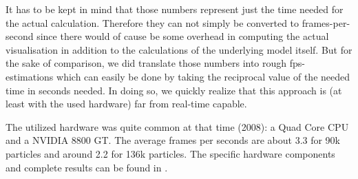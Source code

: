 It has to be kept in mind that those numbers represent just the time needed for the actual calculation. Therefore they can not simply be converted to frames-per-second since there would of cause be some overhead in computing the actual visualisation in addition to the calculations of the underlying model itself. But for the sake of comparison, we did translate those numbers into rough fps-estimations which can easily be done by taking the reciprocal value of the needed time in seconds needed. In doing so, we quickly realize that this approach is (at least with the used hardware) far from real-time capable.

The utilized hardware was quite common at that time (2008): a Quad Core CPU and a NVIDIA 8800 GT. The average frames per seconds are about 3.3 for 90k particles and around 2.2 for 136k particles. The specific hardware components and complete results can be found in \cite{krivstof2009hydraulic}.



